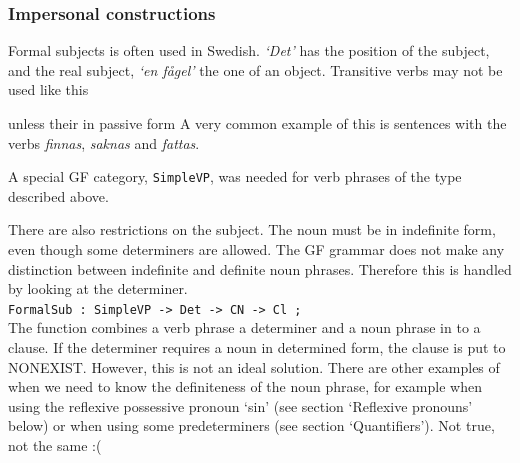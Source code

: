 \documentclass{report}
\begin{document}
\subsubsection{Impersonal constructions}%
\label{sec:Formal}
Formal subjects \cite[19]{SAG} is often used in Swedish.
\emph{`Det'} has the position of the subject, and the real subject, 
\emph{`en fågel'} the one of an object.
Transitive verbs may not be used like this

unless their in passive form
A very common example of this is sentences with the verbs \emph{finnas},
\emph{saknas} and \emph{fattas}.

A special GF category, \verb|SimpleVP|, was needed for verb phrases of the type
described above.

There are also restrictions on the subject.
The noun must be in indefinite form, even though some determiners are allowed.
The GF grammar does not make any distinction between indefinite and definite noun
phrases. Therefore this is handled by looking at the determiner. \\
\verb|FormalSub : SimpleVP -> Det -> CN -> Cl ;|\\
The function combines a verb phrase a determiner and a noun phrase in to a clause.
If the determiner requires a noun in determined form, the clause is put to NONEXIST.
However, this is not an ideal solution. There are other examples of when we
need to know the definiteness of the noun phrase, for example when using
the reflexive possessive pronoun `sin' (see section `Reflexive pronouns' below)
or when using some predeterminers (see section `Quantifiers'). Not true, not the same :(
\end{document}
